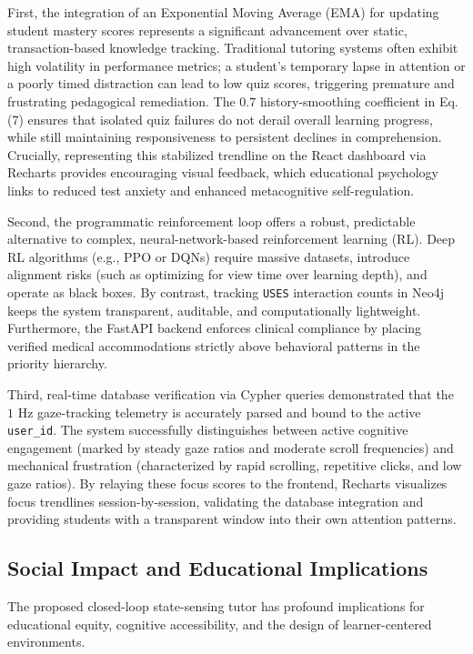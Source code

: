 \documentclass[final,5p,times,twocolumn,authoryear]{elsarticle}
\begin{document}
First, the integration of an Exponential Moving Average (EMA) for updating student mastery scores represents a significant advancement over static, transaction-based knowledge tracking. Traditional tutoring systems often exhibit high volatility in performance metrics; a student's temporary lapse in attention or a poorly timed distraction can lead to low quiz scores, triggering premature and frustrating pedagogical remediation. The $0.7$ history-smoothing coefficient in Eq. (7) ensures that isolated quiz failures do not derail overall learning progress, while still maintaining responsiveness to persistent declines in comprehension. Crucially, representing this stabilized trendline on the React dashboard via Recharts provides encouraging visual feedback, which educational psychology links to reduced test anxiety and enhanced metacognitive self-regulation.

Second, the programmatic reinforcement loop offers a robust, predictable alternative to complex, neural-network-based reinforcement learning (RL). Deep RL algorithms (e.g., PPO or DQNs) require massive datasets, introduce alignment risks (such as optimizing for view time over learning depth), and operate as black boxes. By contrast, tracking \texttt{USES} interaction counts in Neo4j keeps the system transparent, auditable, and computationally lightweight. Furthermore, the FastAPI backend enforces clinical compliance by placing verified medical accommodations strictly above behavioral patterns in the priority hierarchy.

Third, real-time database verification via Cypher queries demonstrated that the $1\text{ Hz}$ gaze-tracking telemetry is accurately parsed and bound to the active \texttt{user\_id}. The system successfully distinguishes between active cognitive engagement (marked by steady gaze ratios and moderate scroll frequencies) and mechanical frustration (characterized by rapid scrolling, repetitive clicks, and low gaze ratios). By relaying these focus scores to the frontend, Recharts visualizes focus trendlines session-by-session, validating the database integration and providing students with a transparent window into their own attention patterns.

\subsection{Social Impact and Educational Implications}
\label{subsec:social_impact_implications}

The proposed closed-loop state-sensing tutor has profound implications for educational equity, cognitive accessibility, and the design of learner-centered environments.
\end{document}
